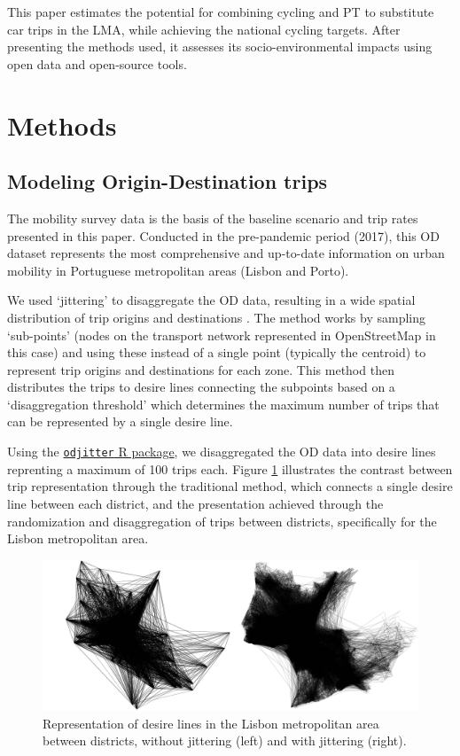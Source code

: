 \documentclass[review, doubleblind, 3p,
authoryear]{elsarticle} %
\begin{document}
This paper estimates the potential for combining cycling and PT to
substitute car trips in the LMA, while achieving the national cycling
targets. After presenting the methods used, it assesses its
socio-environmental impacts using open data and open-source tools.

\section{Methods}\label{methods}

\subsection{Modeling Origin-Destination
trips}\label{modeling-origin-destination-trips}

The mobility survey data \citep{IMOB} is the basis of the baseline
scenario and trip rates presented in this paper. Conducted in the
pre-pandemic period (2017), this OD dataset represents the most
comprehensive and up-to-date information on urban mobility in Portuguese
metropolitan areas (Lisbon and Porto).

We used `jittering' to disaggregate the OD data, resulting in a wide
spatial distribution of trip origins and destinations
\citep{Lovelace2022Jittering}. The method works by sampling `sub-points'
(nodes on the transport network represented in OpenStreetMap in this
case) and using these instead of a single point (typically the centroid)
to represent trip origins and destinations for each zone. This method
then distributes the trips to desire lines connecting the subpoints
based on a `disaggregation threshold' which determines the maximum
number of trips that can be represented by a single desire line.

Using the
\href{https://github.com/dabreegster/odjitter}{\texttt{odjitter} R
package}, we disaggregated the OD data into desire lines reprenting a
maximum of 100 trips each. Figure \ref{fig:jitter} illustrates the
contrast between trip representation through the traditional method,
which connects a single desire line between each district, and the
presentation achieved through the randomization and disaggregation of
trips between districts, specifically for the Lisbon metropolitan area.

\begin{figure}

{\centering \includegraphics[width=1\linewidth,]{img/jitter} 

}

\caption{Representation of desire lines in the Lisbon metropolitan area between districts, without jittering (left) and with jittering (right).}\label{fig:jitter}
\end{figure}
\end{document}
